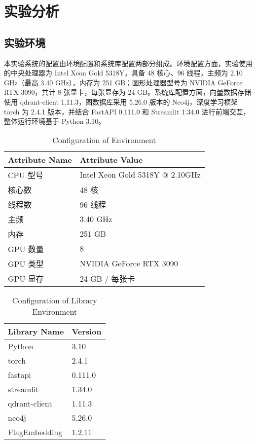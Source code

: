 \chapter{实验分析}

\section{实验环境}

本实验系统的配置由环境配置和系统库配置两部分组成。环境配置方面，实验使用的中央处理器为 Intel Xeon Gold 5318Y，具备 48 核心、96 线程，主频为 2.10 GHz（最高 3.40 GHz），内存为 251 GB；图形处理器型号为 NVIDIA GeForce RTX 3090，共计 8 张显卡，每张显存为 24 GB。系统库配置方面，向量数据存储使用 qdrant-client 1.11.3，图数据库采用 5.26.0 版本的 Neo4j，深度学习框架 torch 为 2.4.1 版本，并结合 FastAPI 0.111.0 和 Streamlit 1.34.0 进行前端交互，整体运行环境基于 Python 3.10。

\begin{table}[h]
  \centering
  \caption{Configuration of Environment}
  \begin{tabular}{l|l}
  \toprule
  \textbf{Attribute Name} & \textbf{Attribute Value} \\ \midrule
  CPU 型号                & Intel Xeon Gold 5318Y @ 2.10GHz       \\
  核心数                  & 48 核                                  \\
  线程数                  & 96 线程                                \\
  主频                    & 3.40 GHz                              \\
  内存              & 251 GB                                        \\
  GPU 数量                & 8             \\
  GPU 类型 & NVIDIA GeForce RTX 3090 \\
  GPU 显存                & 24 GB / 每张卡                         \\
  \bottomrule
  \end{tabular}
  \label{tab:environment}
\end{table}

\begin{table}[h]
  \centering
  \caption{Configuration of Library Environment}
  \begin{tabular}{l|l}
  \toprule
  \textbf{Library Name}    & \textbf{Version} \\ \midrule
  Python                   & 3.10             \\
  torch                    & 2.4.1            \\
  fastapi                  & 0.111.0          \\
  streamlit                & 1.34.0           \\
  qdrant-client            & 1.11.3           \\
  neo4j                    & 5.26.0           \\
  FlagEmbedding            & 1.2.11           \\
  \bottomrule
  \end{tabular}
  \label{tab:library_environment}
\end{table}


